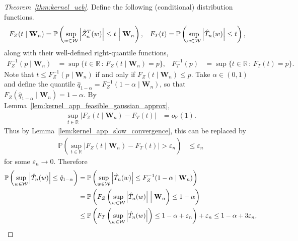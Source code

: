 \documentclass[11pt,lof]{puthesis}
\renewcommand{\P}{\ensuremath{\mathbb{P}}}
\newcommand{\R}{\ensuremath{\mathbb{R}}}
\newcommand{\bW}{\ensuremath{\mathbf{W}}}
\newcommand{\cW}{\ensuremath{\mathcal{W}}}
\theoremstyle{break}
\theoremstyle{proof}
\newtheorem{proof}{Proof}
\begin{document}
\begin{proof}[Theorem~\ref{thm:kernel_ucb}]
  Define the following (conditional) distribution functions.
  \begin{align*}
    F_Z(t \mid \bW_n)
    &=
    \P\left(
      \sup_{w \in \cW}
      \left| \hat Z_n^T(w) \right|
      \leq t
      \Bigm\vert \bW_n
    \right),
    &F_T(t)
    &=
    \P\left(
      \sup_{w \in \cW}
      \left| \hat T_n(w) \right|
      \leq t
    \right),
  \end{align*}
  along with their well-defined right-quantile functions,
  \begin{align*}
    F_Z^{-1}(p \mid \bW_n)
    &=
    \sup
    \big\{
      t \in \R
      \, : \,
      F_Z(t \mid \bW_n)
      = p
    \big\},
    &F_T^{-1}(p)
    &=
    \sup
    \big\{
      t \in \R
      \, : \,
      F_T(t)
      = p
    \big\}.
  \end{align*}
  Note that
  $t \leq F_Z^{-1}(p \mid \bW_n)$
  if and only if
  $F_Z(t \mid \bW_n) \leq p$.
  Take $\alpha \in (0,1)$ and
  define the quantile
  $\hat q_{1-\alpha} = F_Z^{-1}(1-\alpha \mid \bW_n)$,
  so that
  $F_Z(\hat q_{1-\alpha} \mid \bW_n) = 1-\alpha$.
  By Lemma~\ref{lem:kernel_app_feasible_gaussian_approx},
  \begin{align*}
    \sup_{t \in \R}
    \big|
    F_Z(t \mid \bW_n) - F_T(t)
    \big|
    &=
    o_\P(1).
  \end{align*}
  Thus by Lemma~\ref{lem:kernel_app_slow_convergence},
  this can be replaced by
  \begin{align*}
    \P\left(
      \sup_{t \in \R} \big| F_Z(t \mid \bW_n) - F_T(t) \big|
      > \varepsilon_n
    \right)
    &\leq \varepsilon_n
  \end{align*}
  for some $\varepsilon_n \to 0$.
  Therefore
  \begin{align*}
    \P\left(
      \sup_{w \in \cW}
      \left|
        \hat T_n(w)
      \right|
      \leq
      \hat q_{1-\alpha}
    \right)
    &=
    \P\left(
      \sup_{w \in \cW}
      \left|
        \hat T_n(w)
      \right|
      \leq
      F_Z^{-1}(1-\alpha \mid \bW_n)
    \right) \\
    &=
    \P\left(
      F_Z\left(
        \sup_{w \in \cW}
        \left|
          \hat T_n(w)
        \right|
        \Bigm\vert \bW_n
      \right)
      \leq
      1 - \alpha
    \right) \\
    &\leq
    \P\left(
      F_T\left(
        \sup_{w \in \cW}
        \left|
          \hat T_n(w)
        \right|
      \right)
      \leq
      1 - \alpha + \varepsilon_n
    \right)
    + \varepsilon_n
    \leq 1 - \alpha + 3\varepsilon_n,

\end{align*}
\end{proof}
\end{document}
